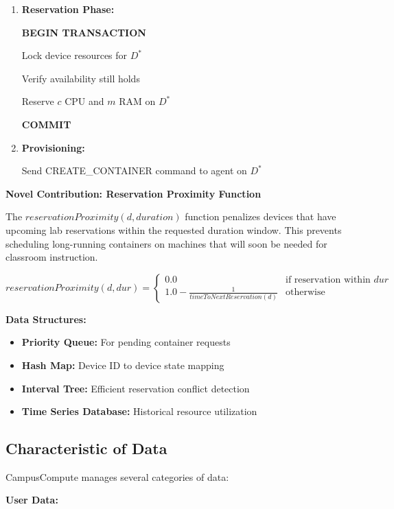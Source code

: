 \documentclass[12pt,a4paper]{article}
\begin{document}
\begin{enumerate}
    $D^* \leftarrow \arg\max_{d \in D_{candidates}} Score(d)$
    
    \item \textbf{Reservation Phase:}
    
    \textbf{BEGIN TRANSACTION}
    
    \quad Lock device resources for $D^*$
    
    \quad Verify availability still holds
    
    \quad Reserve $c$ CPU and $m$ RAM on $D^*$
    
    \quad \textbf{COMMIT}
    
    \item \textbf{Provisioning:}
    
    Send CREATE\_CONTAINER command to agent on $D^*$
\end{enumerate}

\textbf{Novel Contribution: Reservation Proximity Function}

The $reservationProximity(d, duration)$ function penalizes devices that have upcoming lab reservations within the requested duration window. This prevents scheduling long-running containers on machines that will soon be needed for classroom instruction.

$$reservationProximity(d, dur) = \begin{cases} 
0.0 & \text{if reservation within } dur \\
1.0 - \frac{1}{timeTo NextReservation(d)} & \text{otherwise}
\end{cases}$$

\textbf{Data Structures:}

\begin{itemize}
    \item \textbf{Priority Queue:} For pending container requests
    \item \textbf{Hash Map:} Device ID to device state mapping
    \item \textbf{Interval Tree:} Efficient reservation conflict detection
    \item \textbf{Time Series Database:} Historical resource utilization
\end{itemize}
\subsection{Characteristic of Data}
\label{sec:data}

CampusCompute manages several categories of data:

\textbf{User Data:}
\end{document}
